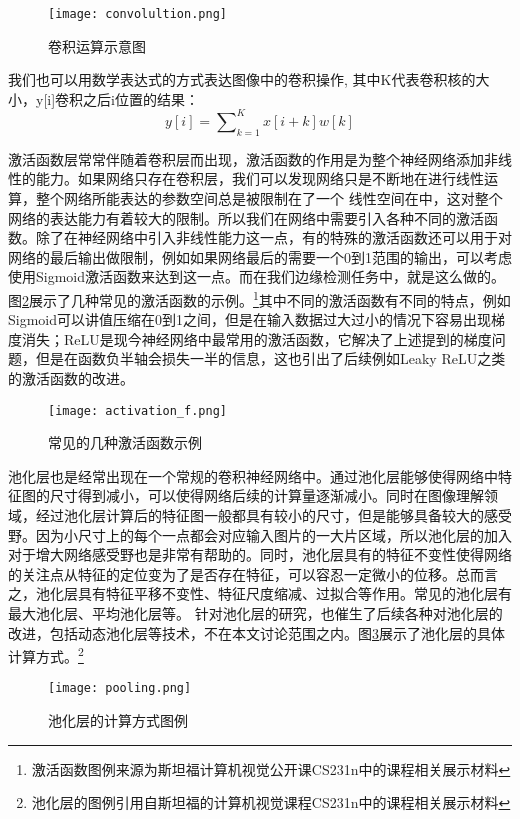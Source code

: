 \documentclass[master]{thesis-uestc}
\begin{document}
\begin{figure}[h]
    \texttt{[image: convolultion.png]}
    \caption{卷积运算示意图}
    \label{conv}
\end{figure}

我们也可以用数学表达式的方式表达图像中的卷积操作, 其中K代表卷积核的大小，y[i]卷积之后i位置的结果：
\begin{equation}
    \label{conv_equation}
	y[i] = \sum\nolimits_{k=1}^{K} x[i + k]w[k]
\end{equation}

激活函数层常常伴随着卷积层而出现，激活函数的作用是为整个神经网络添加非线性的能力。如果网络只存在卷积层，我们可以发现网络只是不断地在进行线性运算，整个网络所能表达的参数空间总是被限制在了一个 线性空间在中，这对整个网络的表达能力有着较大的限制。所以我们在网络中需要引入各种不同的激活函数。除了在神经网络中引入非线性能力这一点，有的特殊的激活函数还可以用于对网络的最后输出做限制，例如如果网络最后的需要一个0到1范围的输出，可以考虑使用Sigmoid激活函数来达到这一点。而在我们边缘检测任务中，就是这么做的。图\ref{activation}展示了几种常见的激活函数的示例。\footnote{激活函数图例来源为斯坦福计算机视觉公开课CS231n中的课程相关展示材料}其中不同的激活函数有不同的特点，例如Sigmoid可以讲值压缩在0到1之间，但是在输入数据过大过小的情况下容易出现梯度消失；ReLU是现今神经网络中最常用的激活函数，它解决了上述提到的梯度问题，但是在函数负半轴会损失一半的信息，这也引出了后续例如Leaky ReLU之类的激活函数的改进。


\begin{figure}[h]
    \texttt{[image: activation\_f.png]}
    \caption{常见的几种激活函数示例}
    \label{activation}
\end{figure}

池化层也是经常出现在一个常规的卷积神经网络中。通过池化层能够使得网络中特征图的尺寸得到减小，可以使得网络后续的计算量逐渐减小。同时在图像理解领域，经过池化层计算后的特征图一般都具有较小的尺寸，但是能够具备较大的感受野。因为小尺寸上的每个一点都会对应输入图片的一大片区域，所以池化层的加入对于增大网络感受野也是非常有帮助的。同时，池化层具有的特征不变性使得网络的关注点从特征的定位变为了是否存在特征，可以容忍一定微小的位移。总而言之，池化层具有特征平移不变性、特征尺度缩减、过拟合等作用。常见的池化层有最大池化层、平均池化层等。 针对池化层的研究，也催生了后续各种对池化层的改进，包括动态池化层等技术，不在本文讨论范围之内。图\ref{pooling}展示了池化层的具体计算方式。\footnote{池化层的图例引用自斯坦福的计算机视觉课程CS231n中的课程相关展示材料}

\begin{figure}[h]
    \texttt{[image: pooling.png]}
    \caption{池化层的计算方式图例}
    \label{pooling}
\end{figure}
\end{document}
